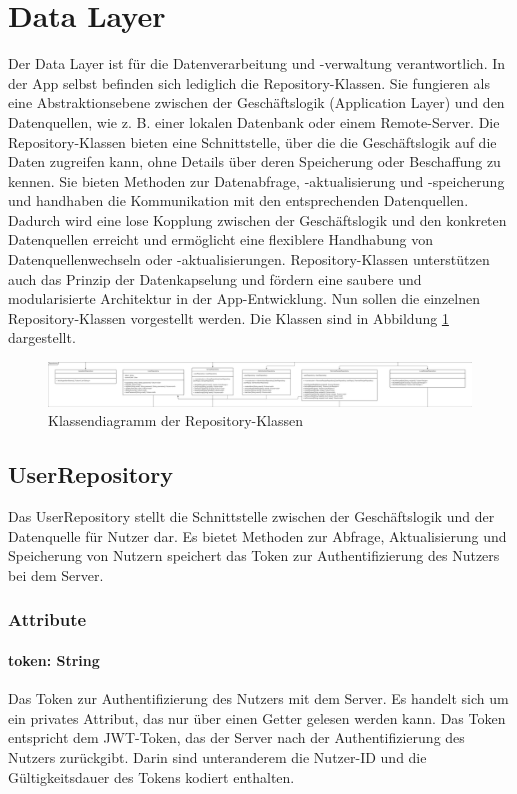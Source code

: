 \documentclass[parskip=full]{scrartcl}
\begin{document}
\section{Data Layer}
Der Data Layer ist für die Datenverarbeitung und -verwaltung verantwortlich. In der App selbst befinden sich lediglich die Repository-Klassen. Sie fungieren als eine Abstraktionsebene zwischen der Geschäftslogik (Application Layer) und den Datenquellen, wie z. B. einer lokalen Datenbank oder einem Remote-Server. Die Repository-Klassen bieten eine Schnittstelle, über die die Geschäftslogik auf die Daten zugreifen kann, ohne Details über deren Speicherung oder Beschaffung zu kennen. Sie bieten Methoden zur Datenabfrage, -aktualisierung und -speicherung und handhaben die Kommunikation mit den entsprechenden Datenquellen. Dadurch wird eine lose Kopplung zwischen der Geschäftslogik und den konkreten Datenquellen erreicht und ermöglicht eine flexiblere Handhabung von Datenquellenwechseln oder -aktualisierungen. Repository-Klassen unterstützen auch das Prinzip der Datenkapselung und fördern eine saubere und modularisierte Architektur in der App-Entwicklung.
Nun sollen die einzelnen Repository-Klassen vorgestellt werden. Die Klassen sind in Abbildung \ref{fig:dataLayer} dargestellt.
\begin{figure}[htp]
    \centering
    \includegraphics[width=\textwidth]{images/dataLayer/dataLayer.pdf}
    \caption{Klassendiagramm der Repository-Klassen}
    \label{fig:dataLayer}
\end{figure}

\subsection{UserRepository}
Das UserRepository stellt die Schnittstelle zwischen der Geschäftslogik und der Datenquelle für Nutzer dar. Es bietet Methoden zur Abfrage, Aktualisierung und Speicherung von Nutzern speichert das Token zur Authentifizierung des Nutzers bei dem Server.
\subsubsection{Attribute}
\paragraph{token: String}
Das Token zur Authentifizierung des Nutzers mit dem Server. Es handelt sich um ein privates Attribut, das nur über einen Getter gelesen werden kann. Das Token entspricht dem JWT-Token, das der Server nach der Authentifizierung des Nutzers zurückgibt. Darin sind unteranderem die Nutzer-ID und die Gültigkeitsdauer des Tokens kodiert enthalten.
\end{document}
